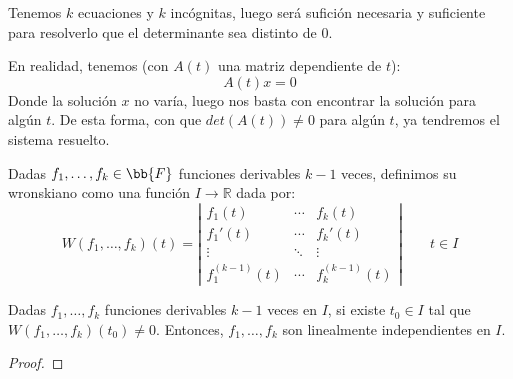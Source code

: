 Tenemos $k$ ecuaciones y $k$ incógnitas, luego será sufición necesaria y suficiente para resolverlo que el determinante sea distinto de 0.

En realidad, tenemos (con $A(t)$ una matriz dependiente de $t$):
\begin{equation*}
    A(t) x = 0
\end{equation*}
Donde la solución $x$ no varía, luego nos basta con encontrar la solución para algún $t$.
De esta forma, con que $det(A(t)) \neq 0$ para algún $t$, ya tendremos el sistema resuelto.

\begin{definicion}[Wronskiano]
    Dadas $f_1,\ldots,f_k\in \bb{F}$ funciones derivables $k-1$ veces, definimos su wronskiano como una función $I\rightarrow\mathbb{R}$ dada por:
    \begin{equation*}
        W(f_1,\ldots,f_k)(t) = \left|\begin{array}{ccc}
            f_1(t) & \cdots & f_k(t) \\
            f_1'(t) & \cdots & f_k'(t) \\
            \vdots & \ddots & \vdots \\
            f_1^{(k-1)}(t) & \cdots & f_k^{(k-1)}(t) 
        \end{array}\right| \qquad t\in I
    \end{equation*}
\end{definicion}

\begin{prop}
    Dadas $f_1,\ldots,f_k$ funciones derivables $k-1$ veces en $I$, si existe $t_0\in I$ tal que $W(f_1,\ldots,f_k)(t_0) \neq 0$. Entonces, $f_1,\ldots,f_k$ son linealmente independientes en $I$.
    \begin{proof}
    \end{proof}
\end{prop}

